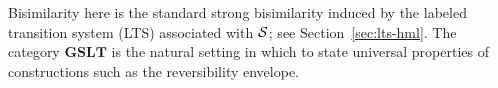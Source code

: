 \begin{remark}
Bisimilarity here is the standard strong bisimilarity induced by the labeled
transition system (LTS) associated with $\mathcal{S}$; see Section~\ref{sec:lts-hml}.
The category $\mathbf{GSLT}$ is the natural setting in which to state
universal properties of constructions such as the reversibility envelope.
\end{remark}

